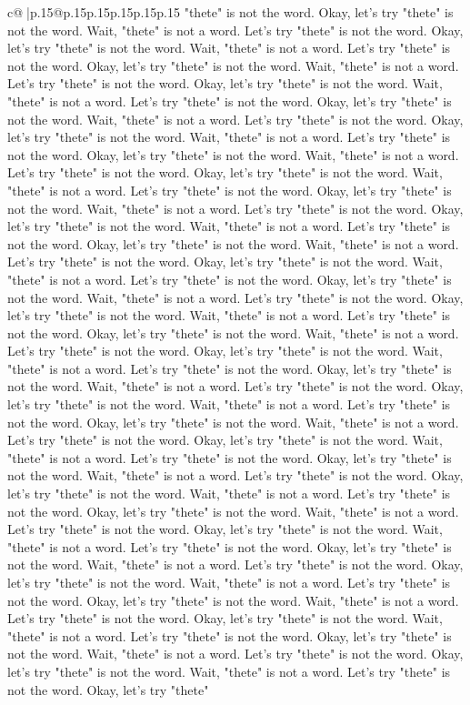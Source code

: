 \documentclass{article}
\begin{document}
{\begin{supertabular}{c@{$\;$}|p{.15\linewidth}@{}p{.15\linewidth}p{.15\linewidth}p{.15\linewidth}p{.15\linewidth}p{.15\linewidth}}
{{{"thete" is not the word. Okay, let's try "thete" is not the word. Wait, "thete" is not a word. Let's try "thete" is not the word. Okay, let's try "thete" is not the word. Wait, "thete" is not a word. Let's try "thete" is not the word. Okay, let's try "thete" is not the word. Wait, "thete" is not a word. Let's try "thete" is not the word. Okay, let's try "thete" is not the word. Wait, "thete" is not a word. Let's try "thete" is not the word. Okay, let's try "thete" is not the word. Wait, "thete" is not a word. Let's try "thete" is not the word. Okay, let's try "thete" is not the word. Wait, "thete" is not a word. Let's try "thete" is not the word. Okay, let's try "thete" is not the word. Wait, "thete" is not a word. Let's try "thete" is not the word. Okay, let's try "thete" is not the word. Wait, "thete" is not a word. Let's try "thete" is not the word. Okay, let's try "thete" is not the word. Wait, "thete" is not a word. Let's try "thete" is not the word. Okay, let's try "thete" is not the word. Wait, "thete" is not a word. Let's try "thete" is not the word. Okay, let's try "thete" is not the word. Wait, "thete" is not a word. Let's try "thete" is not the word. Okay, let's try "thete" is not the word. Wait, "thete" is not a word. Let's try "thete" is not the word. Okay, let's try "thete" is not the word. Wait, "thete" is not a word. Let's try "thete" is not the word. Okay, let's try "thete" is not the word. Wait, "thete" is not a word. Let's try "thete" is not the word. Okay, let's try "thete" is not the word. Wait, "thete" is not a word. Let's try "thete" is not the word. Okay, let's try "thete" is not the word. Wait, "thete" is not a word. Let's try "thete" is not the word. Okay, let's try "thete" is not the word. Wait, "thete" is not a word. Let's try "thete" is not the word. Okay, let's try "thete" is not the word. Wait, "thete" is not a word. Let's try "thete" is not the word. Okay, let's try "thete" is not the word. Wait, "thete" is not a word. Let's try "thete" is not the word. Okay, let's try "thete" is not the word. Wait, "thete" is not a word. Let's try "thete" is not the word. Okay, let's try "thete" is not the word. Wait, "thete" is not a word. Let's try "thete" is not the word. Okay, let's try "thete" is not the word. Wait, "thete" is not a word. Let's try "thete" is not the word. Okay, let's try "thete" is not the word. Wait, "thete" is not a word. Let's try "thete" is not the word. Okay, let's try "thete" is not the word. Wait, "thete" is not a word. Let's try "thete" is not the word. Okay, let's try "thete" is not the word. Wait, "thete" is not a word. Let's try "thete" is not the word. Okay, let's try "thete" is not the word. Wait, "thete" is not a word. Let's try "thete" is not the word. Okay, let's try "thete" is not the word. Wait, "thete" is not a word. Let's try "thete" is not the word. Okay, let's try "thete" is not the word. Wait, "thete" is not a word. Let's try "thete" is not the word. Okay, let's try "thete" is not the word. Wait, "thete" is not a word. Let's try "thete" is not the word. Okay, let's try "thete" is not the word. Wait, "thete" is not a word. Let's try "thete" is not the word. Okay, let's try "thete" }}}
\end{supertabular}}
\end{document}
